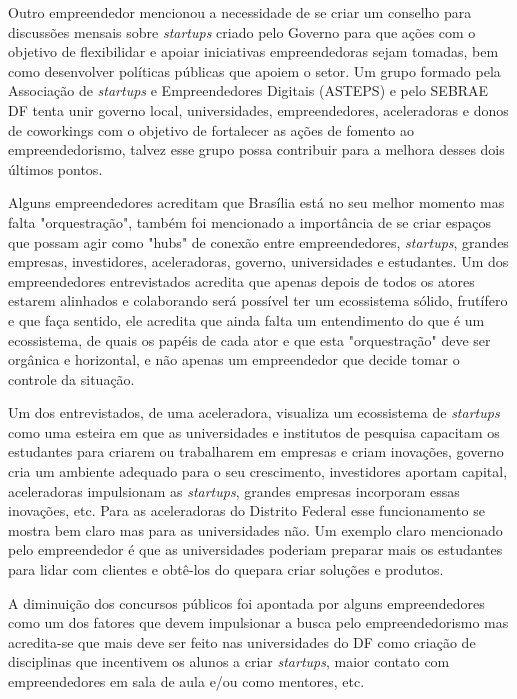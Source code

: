 Outro empreendedor mencionou a necessidade de se criar um conselho para discussões mensais sobre \textit{startups} criado pelo Governo para que ações com o objetivo de flexibilidar e apoiar iniciativas empreendedoras sejam tomadas, bem como desenvolver políticas públicas que apoiem o setor. Um grupo formado pela Associação de \textit{startups} e Empreendedores Digitais (ASTEPS) e pelo SEBRAE DF tenta unir governo local, universidades, empreendedores, aceleradoras e donos de coworkings com o objetivo de fortalecer as ações de fomento ao empreendedorismo, talvez esse grupo possa contribuir para a melhora desses  dois últimos pontos.

Alguns empreendedores acreditam que Brasília está no seu melhor momento mas falta "orquestração", também foi mencionado a importância de se criar espaços que possam agir como "hubs" de conexão entre empreendedores, \textit{startups}, grandes empresas, investidores, aceleradoras, governo, universidades e estudantes. Um dos empreendedores entrevistados acredita que apenas depois de todos os atores estarem alinhados e colaborando será possível ter um ecossistema sólido, frutífero e que faça sentido, ele acredita que ainda falta um entendimento do que é um ecossistema, de quais os papéis de cada ator e que esta "orquestração" deve ser orgânica e horizontal, e não apenas um empreendedor que decide tomar o controle da situação. 

Um dos entrevistados, de uma aceleradora, visualiza um ecossistema de \textit{startups} como uma esteira em que as universidades e institutos de pesquisa capacitam os estudantes para criarem ou trabalharem em empresas e criam inovações, governo cria um ambiente adequado para o seu crescimento, investidores aportam capital, aceleradoras impulsionam as \textit{startups}, grandes empresas incorporam essas inovações, etc. Para as aceleradoras do Distrito Federal esse funcionamento se mostra bem claro mas para as universidades não. Um exemplo claro mencionado pelo empreendedor é que as universidades poderiam preparar mais os estudantes para lidar com clientes e obtê-los do quepara criar soluções e produtos.

A diminuição dos concursos públicos foi apontada por alguns empreendedores como um dos fatores que devem impulsionar a busca pelo empreendedorismo mas acredita-se que mais deve ser feito nas universidades do DF como criação de disciplinas que incentivem os alunos a criar \textit{startups}, maior contato com empreendedores em sala de aula e/ou como mentores, etc.

